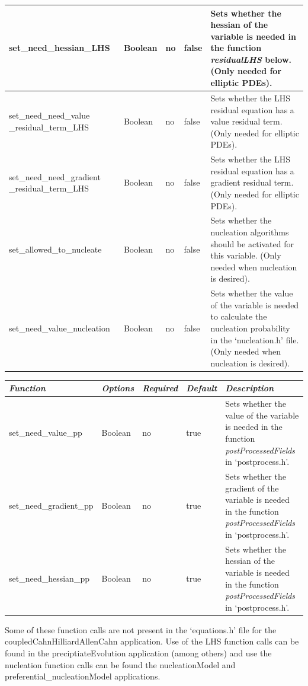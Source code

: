 \documentclass[10pt]{article} %
\begin{document}
\begin{center}
\begin{tabular}{ | p{} | p{}| p{} | p{} | p{} |}
    set\_need\_hessian\_LHS & Boolean & no & false & Sets whether the hessian of the variable is needed in the function \emph{residualLHS} below. (Only needed for elliptic PDEs). \\ \hline
    set\_need\_need\_value \_residual\_term\_LHS & Boolean & no & false & Sets whether the LHS residual equation has a value residual term. (Only needed for elliptic PDEs). \\ \hline
    set\_need\_need\_gradient \_residual\_term\_LHS & Boolean & no & false & Sets whether the LHS residual equation has a gradient residual term. (Only needed for elliptic PDEs). \\ \hline
    set\_allowed\_to\_nucleate & Boolean & no & false & Sets whether the nucleation algorithms should be activated for this variable. (Only needed when nucleation is desired). \\ \hline
    set\_need\_value\_nucleation & Boolean & no & false & Sets whether the value of the variable is needed to calculate the nucleation probability in the `nucleation.h' file. (Only needed when nucleation is desired). \\ \hline
    \end{tabular}
\end{center}
\normalsize

\footnotesize
\begin{center}
    \begin{tabular}{ | p{} | p{}| p{} | p{} | p{} |}
    \hline
    \emph{Function}  & \emph{Options} & \emph{Required} & \emph{Default} & \emph{Description} \\ \hline
    set\_need\_value\_pp & Boolean & no & true  & Sets whether the value of the variable is needed in the function \emph{postProcessedFields} in `postprocess.h'. \\ \hline
    set\_need\_gradient\_pp & Boolean & no & true & Sets whether the gradient of the variable is needed in the function \emph{postProcessedFields} in `postprocess.h'. \\ \hline
    set\_need\_hessian\_pp & Boolean & no & true & Sets whether the hessian of the variable is needed in the function \emph{postProcessedFields} in `postprocess.h'. \\ \hline
    \end{tabular}
\end{center}
\normalsize

Some of these function calls are not present in the `equations.h' file for the coupledCahnHilliardAllenCahn application. Use of the LHS function calls can be found in the preciptiateEvolution application (among others) and use the nucleation function calls can be found the nucleationModel and preferential\_nucleationModel applications.
\end{document}
